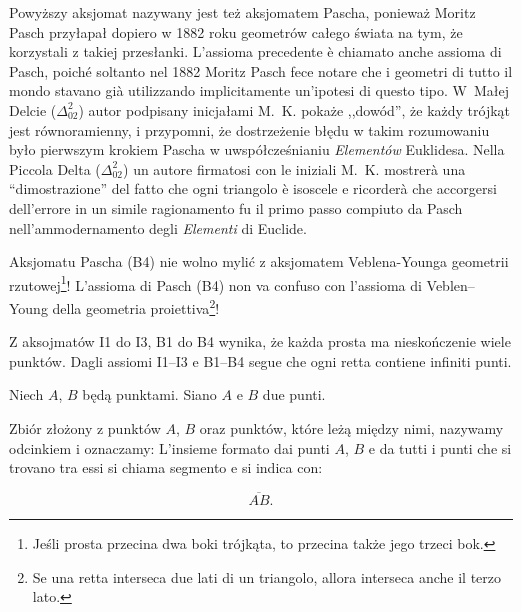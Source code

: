 Powyższy aksjomat nazywany jest też aksjomatem Pascha, ponieważ Moritz Pasch \cite{pasch_1882} przyłapał dopiero w 1882 roku geometrów całego świata na tym, że korzystali z takiej przesłanki. %
L'assioma precedente è chiamato anche assioma di Pasch, poiché soltanto nel 1882 Moritz Pasch \cite{pasch_1882} fece notare che i geometri di tutto il mondo stavano già utilizzando implicitamente un'ipotesi di questo tipo. %
W~Małej Delcie ($\Delta_{02}^{2}$) autor podpisany inicjałami M.~K. pokaże ,,dowód'', że każdy trójkąt jest równoramienny, i przypomni, że dostrzeżenie błędu w takim rozumowaniu było pierwszym krokiem Pascha w uwspółcześnianiu \emph{Elementów} Euklidesa. %
Nella Piccola Delta ($\Delta_{02}^{2}$) un autore firmatosi con le iniziali M.~K. mostrerà una ``dimostrazione'' del fatto che ogni triangolo è isoscele e ricorderà che accorgersi dell'errore in un simile ragionamento fu il primo passo compiuto da Pasch nell'ammodernamento degli \emph{Elementi} di Euclide. %


%

Aksjomatu Pascha (B4) nie wolno mylić z aksjomatem Veblena-Younga geometrii rzutowej\footnote{Jeśli prosta przecina dwa boki trójkąta, to przecina także jego trzeci bok. }! %
L'assioma di Pasch (B4) non va confuso con l'assioma di Veblen--Young della geometria proiettiva\footnote{Se una retta interseca due lati di un triangolo, allora interseca anche il terzo lato. }! %


\begin{proposition}
    Z aksojmatów I1 do I3, B1 do B4 wynika, że każda prosta ma nieskończenie wiele punktów. %
    Dagli assiomi I1--I3 e B1--B4 segue che ogni retta contiene infiniti punti. %
\end{proposition}

\begin{definition}
[odcinek] %
[segmento] %
    Niech $A$, $B$ będą punktami. %
    Siano $A$ e $B$ due punti. %

    Zbiór złożony z punktów $A$, $B$ oraz punktów, które leżą między nimi, nazywamy odcinkiem i oznaczamy: %
    L'insieme formato dai punti $A$, $B$ e da tutti i punti che si trovano tra essi si chiama segmento e si indica con: %


    \begin{equation}
        \overline{AB}.
    \end{equation}
\end{definition}

